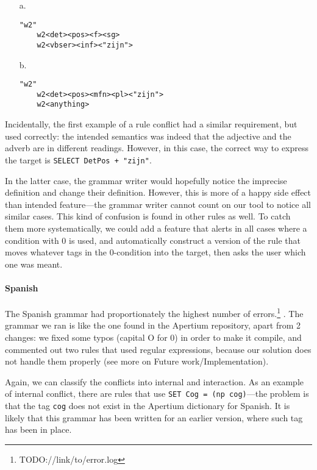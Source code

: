 \begin{itemize}
\item[a.] \begin{verbatim}
"w2"
    w2<det><pos><f><sg>
    w2<vbser><inf><"zijn">
\end{verbatim}

\item[b.] \begin{verbatim}
"w2"
    w2<det><pos><mfn><pl><"zijn">
    w2<anything>
\end{verbatim}
\end{itemize}

Incidentally, the first example of a rule conflict had a similar requirement, but used correctly: the intended semantics was indeed that the adjective and the adverb are in different readings. However, in this case, the correct way to express the target is \texttt{SELECT DetPos + "zijn"}.

In the latter case, the grammar writer would hopefully notice the imprecise definition and change their definition. However, this is more of a happy side effect than intended feature---the grammar writer cannot count on our tool to notice all similar cases.
This kind of confusion is found in other rules as well. 
To catch them more systematically, we could add a feature that alerts in all cases where a condition with 0 is used, and automatically construct a version of the rule that moves whatever tags in the 0-condition into the target, then asks the user which one was meant.

\paragraph{Spanish} The Spanish grammar had proportionately the highest number of errors.\footnote{TODO://link/to/error.log} .  The grammar we ran is like the one found in the Apertium repository, apart from 2 changes: we fixed some typos (capital O for 0) in order to make it compile, and commented out two rules that used regular expressions, because our solution does not handle them properly (see more on Future work/Implementation).

Again, we can classify the conflicts into internal and interaction. As an example of internal conflict, there are  rules that use \texttt{SET Cog = (np cog)}---the problem is that the tag \texttt{cog} does not exist in the Apertium dictionary for Spanish. It is likely that this grammar has been written for an earlier version, where such tag has been in place.




